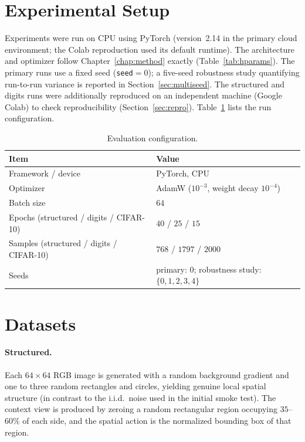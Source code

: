 \section{Experimental Setup}
Experiments were run on CPU using PyTorch (version~2.14 in the primary cloud
environment; the Colab reproduction used its default runtime). The
architecture and optimizer follow Chapter~\ref{chap:method} exactly
(Table~\ref{tab:hparams}). The primary runs use a fixed seed
(\texttt{seed}$=0$); a five-seed robustness study quantifying run-to-run
variance is reported in Section~\ref{sec:multiseed}. The structured and
digits runs were additionally reproduced on an independent machine (Google Colab) to check reproducibility
(Section~\ref{sec:repro}). Table~\ref{tab:setup} lists the run configuration.

\begin{table}[htbp]
    \centering
    \caption{Evaluation configuration.}
    \label{tab:setup}
    \begin{tabular}{ll}
        \toprule
        \textbf{Item} & \textbf{Value} \\
        \midrule
        Framework / device & PyTorch, CPU \\
        Optimizer & AdamW ($10^{-3}$, weight decay $10^{-4}$) \\
        Batch size & $64$ \\
        Epochs (structured / digits / CIFAR-10) & $40$ / $25$ / $15$ \\
        Samples (structured / digits / CIFAR-10) & $768$ / $1797$ / $2000$ \\
        Seeds & primary: $0$; robustness study: $\{0,1,2,3,4\}$ \\
        \bottomrule
    \end{tabular}
\end{table}

\section{Datasets}
\label{sec:datasets}
\paragraph{Structured.} Each $64\times64$ RGB image is generated with a
random background gradient and one to three random rectangles and circles,
yielding genuine local spatial structure (in contrast to the i.i.d.\ noise
used in the initial smoke test). The context view is produced by zeroing a
random rectangular region occupying $35$--$60\%$ of each side, and the
spatial action is the normalized bounding box of that region.

